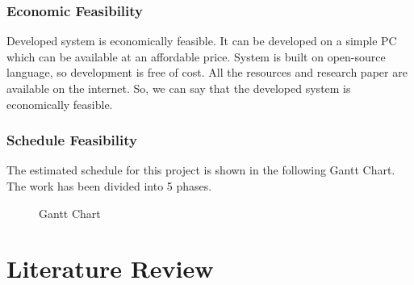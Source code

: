 \subsection{Economic Feasibility}
Developed system is economically feasible. It can be developed on a simple PC which can be available at an affordable price. System is built on open-source language, so development is free of cost. All the resources and research paper are available on the internet. So, we can say that the developed system is economically feasible.
\subsection{Schedule Feasibility}
The estimated schedule for this project is shown in the following Gantt Chart. The work has been divided into 5 phases.
\begin{figure}[!h] %
\begin{center}
	\caption{Gantt Chart} %
	\label{figGanttChart} %
\end{center}
\end{figure}


\chapter{Literature Review}

